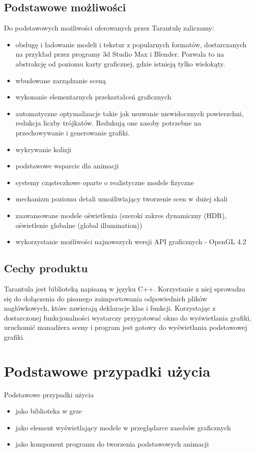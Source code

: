 \documentclass[11pt,leqno]{article}
\begin{document}
\subsection{Podstawowe możliwości}
\noindent
Do podstawowych możliwości oferowanych przez Tarantulę zaliczamy:
\begin{itemize}
 \item obsługę i ładowanie modeli i tekstur z popularnych formatów, dostarczanych na przykład przez programy 3d Studio Max i Blender. 
 Pozwala to na abstrakcję od poziomu karty graficznej, gdzie istnieją tylko wielokąty.
  \item wbudowane zarządzanie sceną
\item wykonanie elementarnych przekształceń graficznych
\item automatyczne optymalizacje takie jak usuwanie niewidocznych powierzchni, redukcja liczby trójkatów. Redukują one zasoby potrzebne na przechowywanie i generowanie grafiki.
\item wykrywanie kolizji
\item podstawowe wsparcie dla animacji
\item systemy cząsteczkowe oparte o realistyczne modele fizyczne
\item mechanizm poziomu detali umożliwiający tworzenie scen w dużej skali
\item zaawansowane modele oświetlenia (szeroki zakres dynamiczny (HDR), oświetlenie globalne (global illumination))
\item wykorzystanie możliwości najnowszych wersji API graficznych  - OpenGL 4.2
\end{itemize}


\subsection{Cechy produktu}
\noindent
Tarantula jest biblioteką napisaną w języku C++. Korzystanie z niej sprowadza się do dołączenia do pisanego zaimportowania odpowiednich plików nagłówkowych, 
które zawierają deklaracje klas i funkcji. Korzystając z dostarczonej funkcjonalności wystarczy przygotować okno do wyświetlania grafiki, 
uruchomić manadżera sceny i program jest gotowy do wyświetlania podstawowej grafiki.




\section{Podstawowe przypadki użycia}
Podstawowe przypadki użycia
\begin{itemize}
\item jako biblioteka w grze
\item jako element wyświetlający modele w przeglądarce zasobów graficznych
\item jako komponent programu do tworzenia podstawowych animacji
\end{itemize}
\end{document}
